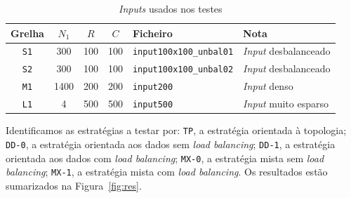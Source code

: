 \documentclass[10pt,a4paper,oneside]{article}
\begin{document}
\begin{table}[H]
  \small
  \caption{\textit{Inputs} usados nos testes}
  \label{tab:inps}
  \centering
  \begin{tabular}{|c|c|c|c|l|l|}
    \hline
    Grelha   & $N_1$ & $R$ & $C$ & Ficheiro                    & Nota \\ \hline \hline
    {\tt S1} & 300   & 100 & 100 & {\tt input100x100\_unbal01} & \textit{Input} desbalanceado \\ \hline
    {\tt S2} & 300   & 100 & 100 & {\tt input100x100\_unbal02} & \textit{Input} desbalanceado \\ \hline
    {\tt M1} & 1400  & 200 & 200 & {\tt input200}              & \textit{Input} denso \\ \hline
    {\tt L1} & 4     & 500 & 500 & {\tt input500}              & \textit{Input} muito esparso \\ \hline
  \end{tabular}
\end{table}

Identificamos as estratégias a testar por: {\tt TP}, a estratégia
orientada à topologia; {\tt DD-0}, a estratégia orientada aos dados
sem \textit{load balancing}; {\tt DD-1}, a estratégia orientada aos
dados com \textit{load balancing}; {\tt MX-0}, a estratégia mista sem
\textit{load balancing}; {\tt MX-1}, a estratégia mista com
\textit{load balancing}. Os resultados estão sumarizados na
Figura~\ref{fig:res}.
\end{document}
